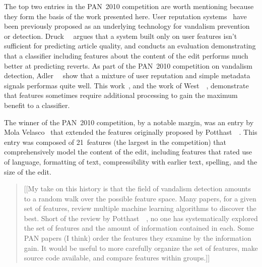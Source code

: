 The top two entries in the PAN~2010 competition are worth mentioning
because they form the basis of the work presented here.
User reputation systems~\cite{WikiTrust06,WikiMTWtrust06,www07}
have been previously proposed as an underlying technology for
vandalism prevention or detection.
Druck~\etal~\cite{Druck2008} argues that a system built only on user
features isn't sufficient for predicting article quality, and conducts
an evaluation demonstrating that a classifier including features about
the content of the edit performs much better at predicting reverts.
As part of the PAN~2010 competition on vandalism detection,
Adler~\etal~\cite{Adler2010} show that a mixture of user reputation
and simple metadata signals performas quite well.
This work~\cite{Adler2010}, and the work of
West~\etal~\cite{West2010}, demonstrate that features sometimes
require additional processing to gain the maximum benefit to a classifier.

The winner of the PAN~2010 competition, by a notable margin, was
an entry by Mola Velasco~\cite{Mola2010} that extended the features
originally proposed by Potthast~\etal~\cite{Potthast2008}.
This entry was composed of 21~features (the largest in the
competition) that comprehensively model the content of the edit,
including features that rated use of language, formatting of text,
compressibility with earlier text, spelling,
and the size of the edit.

\begin{quote}
[[My take on this history is that the field of vandalism detection
amounts to a random walk over the possible feature space.
Many papers, for a given set of features, review multiple machine
learning algorithms to discover the best.
Short of the review by Potthast~\etal~\cite{Potthast2010b}, no one
has systematically explored the set of features and the amount of
information contained in each.
Some PAN papers (I think) order the features they examine by the
information gain.
It would be useful to more carefully organize the set of features,
make source code available, and compare features within groups.]]
\end{quote}

